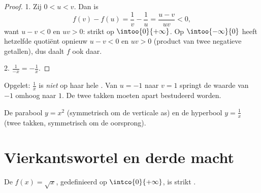 \begin{proof}
1. Zij $0 < u < v$. Dan is
\[
f(v) - f(u) = \frac1v - \frac1u = \frac{u - v}{uv} < 0,
\]
want $u - v < 0$ en $uv > 0$: strikt  op $\intoo{0}{+\infty}$. Op
$\intoo{-\infty}{0}$ heeft hetzelfde quotiënt opnieuw $u - v < 0$ en
$uv > 0$ (product van twee negatieve getallen), dus daalt $f$ ook daar.

2. $\frac{1}{-x} = -\frac1x$.
\end{proof}

\begin{remark}
Opgelet: $\frac1x$ is \emph{niet}  op haar hele . Van $u = -1$
naar $v = 1$ springt de waarde van $-1$ omhoog naar $1$. De twee takken
moeten apart bestudeerd worden.
\end{remark}

\begin{omfigure}
\hfill
{}

{\small De parabool $y = x^2$ (symmetrisch om de verticale as) en de
hyperbool $y = \frac1x$ (twee takken, symmetrisch om de oorsprong).}
\end{omfigure}

\section{Vierkantswortel en derde macht}

\begin{proposition}[Vierkantswortelfunctie]\label{prop:g10:reffunc:sqrt}
De  $f(x) = \sqrt{x}$, gedefinieerd op $\intco{0}{+\infty}$, is
strikt .
\end{proposition}

